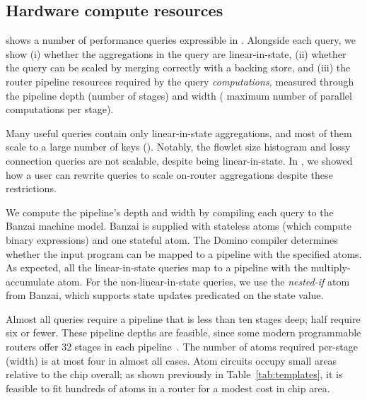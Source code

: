 \subsection{Hardware compute resources}
\label{s:eval:hardware}
\label{sec:eval:hardware}

 shows a number of performance queries
expressible in \TheSystem. Alongside each query, we show (i) whether the
aggregations in the query are linear-in-state, (ii) whether the query can be
scaled by merging correctly with a backing store, and
(iii) the router pipeline resources required by the query {\em computations,}
measured through the pipeline depth (\ie number of stages) and width (\ie
maximum number of parallel computations per stage).

Many useful queries contain only linear-in-state aggregations, and most of them
scale to a large number of keys (). Notably,
the flowlet size histogram and lossy connection queries are not scalable,
despite being linear-in-state. In , we showed how a
user can rewrite queries to scale on-router aggregations despite these
restrictions.

We compute the pipeline's depth and width by compiling each query to the Banzai
machine model. Banzai is supplied with stateless atoms (which compute binary
expressions) and one stateful atom. The Domino compiler determines whether the
input program can be mapped to a pipeline with the specified atoms. As
expected, all the linear-in-state queries map to a pipeline with the
multiply-accumulate atom. For the non-linear-in-state queries, we use the {\em
nested-if} atom from Banzai, which supports state updates predicated on the
state value.

Almost all queries require a pipeline that is less than ten stages deep; half
require six or fewer. These pipeline depths are feasible, since some modern
programmable routers offer 32 stages in each pipeline~\cite{rmt}. The number of
atoms required per-stage (width) is at most four in almost all cases.  Atom
circuits occupy small areas relative to the chip overall; as shown previously in
Table~\ref{tab:templates}, it is feasible to fit hundreds of atoms in a router
for a modest cost in chip area.
